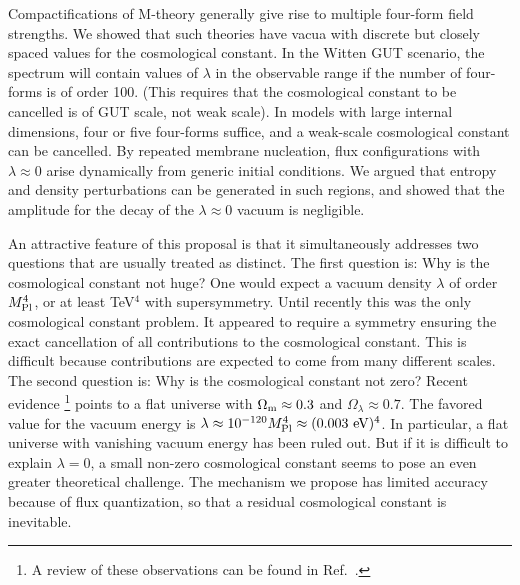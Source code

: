 \documentclass[12pt]{article}
\begin{document}
Compactifications of M-theory generally give rise to multiple
four-form field strengths.  We showed that such theories have vacua
with discrete but closely spaced values for the cosmological constant.
In the Witten GUT scenario, the spectrum will contain values of
$\lambda$ in the observable range if the number of four-forms is of
order 100.  (This requires that the cosmological constant to be
cancelled is of GUT scale, not weak scale).  In models with large
internal dimensions, four or five four-forms suffice, and a weak-scale
cosmological constant can be cancelled.  By repeated membrane
nucleation, flux configurations with $\lambda \approx 0$ arise
dynamically from generic initial conditions.  We argued that entropy
and density perturbations can be generated in such regions, and showed
that the amplitude for the decay of the $\lambda \approx 0$ vacuum is
negligible.

An attractive feature of this proposal is that it simultaneously
addresses two questions that are usually treated as distinct.  The
first question is: Why is the cosmological constant not huge?  One
would expect a vacuum density $\lambda$ of order $M_{\rm Pl}^4$, or at
least TeV$^4$ with supersymmetry.  Until recently this was the only
cosmological constant problem.  It appeared to require a symmetry
ensuring the exact cancellation of all contributions to the
cosmological constant.  This is difficult because contributions are
expected to come from many different scales.  The second question is:
Why is the cosmological constant not zero?  Recent evidence%
%
\footnote{A review of these observations can be found in
Ref.~\cite{Car00}.}
%
points to a flat universe with $\Omega_{\rm m} \approx 0.3$ and
$\Omega_\lambda \approx 0.7$.  The favored value for the vacuum energy
is $\lambda \approx 10^{-120} M_{\rm Pl}^4 \approx (0.003 \mbox{
  eV})^4$.  In particular, a flat universe with vanishing vacuum
energy has been ruled out.  But if it is difficult to explain
$\lambda=0$, a small non-zero cosmological constant seems to pose an
even greater theoretical challenge.  The mechanism we propose has
limited accuracy because of flux quantization, so that a residual
cosmological constant is inevitable.
\end{document}
